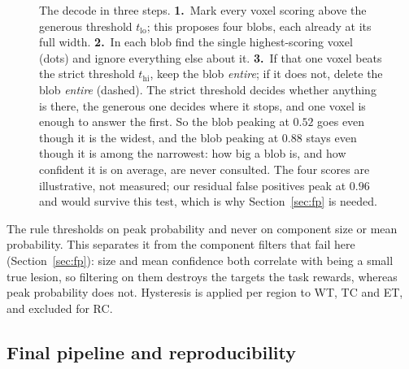 \documentclass[runningheads]{llncs}
\begin{document}
\begin{figure}[t]
\caption{The decode in three steps. \textbf{1.}~Mark every voxel scoring above the generous
threshold $t_{\mathrm{lo}}$; this proposes four blobs, each already at its full width.
\textbf{2.}~In each blob find the single highest-scoring voxel (dots) and ignore everything else
about it. \textbf{3.}~If that one voxel beats the strict threshold $t_{\mathrm{hi}}$, keep the
blob \emph{entire}; if it does not, delete the blob \emph{entire} (dashed). The strict threshold
decides whether anything is there, the generous one decides where it stops, and one voxel is
enough to answer the first. So the blob peaking at $0.52$ goes even though it is the widest, and
the blob peaking at $0.88$ stays even though it is among the narrowest: how big a blob is, and how
confident it is on average, are never consulted. The four scores are illustrative, not measured;
our residual false positives peak at $0.96$ and would survive this test, which is why
Section~\ref{sec:fp} is needed.}
\label{fig:hyst}
\end{figure}

The rule thresholds on peak probability and never on component size or mean probability. This
separates it from the component filters that fail here (Section~\ref{sec:fp}): size and mean
confidence both correlate with being a small true lesion, so filtering on them destroys the
targets the task rewards, whereas peak probability does not. Hysteresis is applied per region to
WT, TC and ET, and excluded for RC.

\subsection{Final pipeline and reproducibility}
\end{document}
